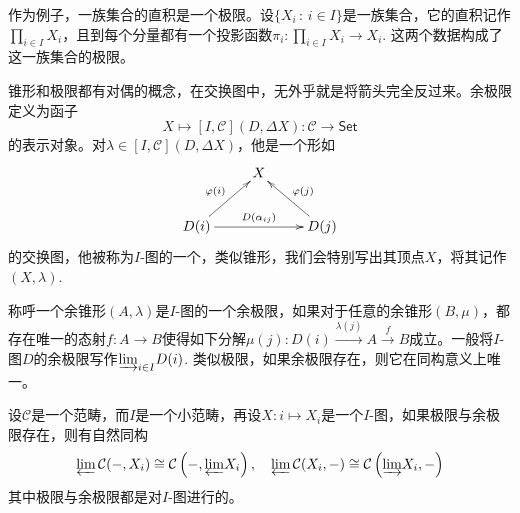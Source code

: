 作为例子，一族集合的直积是一个极限。设$\{X_i\,:\, i\in I\}$是一族集合，它的直积记作$\prod_{i\in I}X_i$，且到每个分量都有一个投影函数$\pi_i:\prod_{i\in I}X_i\to X_i$. 这两个数据构成了这一族集合的极限。

\begin{para}[余锥形与余极限]
锥形和极限都有对偶的概念，在交换图中，无外乎就是将箭头完全反过来。余极限定义为函子
\[
	X\mapsto [I,\mathcal{C}](D,\Delta X):\mathcal{C}\to \mathsf{Set}
\]
的表示对象。对$\lambda\in [I,\mathcal{C}](D,\Delta X)$，他是一个形如
\[
	\xymatrix{
		&X&\\
		D(i)\ar[rr]^-{D(\alpha_{ij})}\ar[ur]^{\varphi(i)}&&D(j)\ar[ul]_{\varphi(j)}
	}
\]
的交换图，他被称为$I$-图的一个，类似锥形，我们会特别写出其顶点$X$，将其记作$(X,\lambda)$.

称呼一个余锥形$(A,\lambda)$是$I$-图的一个{余极限}，如果对于任意的余锥形$(B,\mu)$，都存在唯一的态射$f:A\to B$使得如下分解$\mu(j):D(i)\xrightarrow{\lambda(j)}A\xrightarrow{f}B$成立。一般将$I$-图$D$的余极限写作${\varinjlim}_{i\in I} D(i)$. 类似极限，如果余极限存在，则它在同构意义上唯一。
\end{para}

\begin{pro}\label{homlimit}
设$\mathcal{C}$是一个范畴，而$I$是一个小范畴，再设$X:i\mapsto X_i$是一个$I$-图，如果极限与余极限存在，则有自然同构
\[
	{\varprojlim} \,\mathcal{C}(-,X_i)\cong \mathcal{C}\left(-,{\varprojlim} X_i\right),\quad {\varprojlim}\, \mathcal{C}(X_i,-)\cong  \mathcal{C}\left({\varinjlim} X_i,-\right)
\]
其中极限与余极限都是对$I$-图进行的。
\end{pro}


